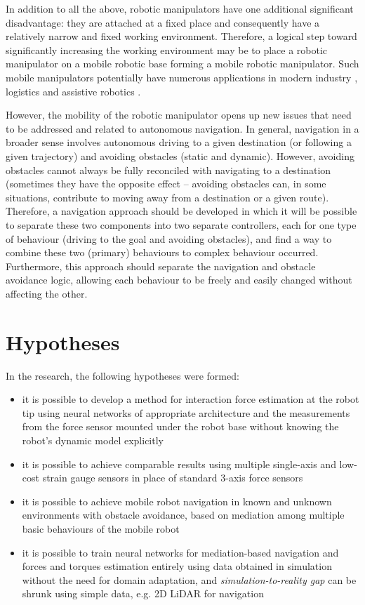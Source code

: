 In addition to all the above, robotic manipulators have one additional significant disadvantage: they are attached at a fixed place and consequently have a relatively narrow and fixed working environment. Therefore, a logical step toward significantly increasing the working environment may be to place a robotic manipulator on a mobile robotic base forming a mobile robotic manipulator. Such mobile manipulators potentially have numerous applications in modern industry \cite{Madsen2015}, logistics \cite{Iriondo2019} and assistive robotics \cite{Park2020}.

However, the mobility of the robotic manipulator opens up new issues that need to be addressed and related to autonomous navigation. In general, navigation in a broader sense involves autonomous driving to a given destination (or following a given trajectory) and avoiding obstacles (static and dynamic). However, avoiding obstacles cannot always be fully reconciled with navigating to a destination (sometimes they have the opposite effect -- avoiding obstacles can, in some situations, contribute to moving away from a destination or a given route). Therefore, a navigation approach should be developed in which it will be possible to separate these two components into two separate controllers, each for one type of behaviour (driving to the goal and avoiding obstacles), and find a way to combine these two (primary) behaviours to complex behaviour occurred. Furthermore, this approach should separate the navigation and obstacle avoidance logic, allowing each behaviour to be freely and easily changed without affecting the other.

\section{Hypotheses}

In the research, the following hypotheses were formed:

\begin{itemize}
    \item it is possible to develop a method for interaction force estimation at the robot tip using neural networks of appropriate architecture and the measurements from the force sensor mounted under the robot base without knowing the robot's dynamic model explicitly
    \item it is possible to achieve comparable results using multiple single-axis and low-cost strain gauge sensors in place of standard 3-axis force sensors
    \item it is possible to achieve mobile robot navigation in known and unknown environments with obstacle avoidance, based on mediation among multiple basic behaviours of the mobile robot
    \item it is possible to train neural networks for mediation-based navigation and forces and torques estimation entirely using data obtained in simulation without the need for domain adaptation, and \emph{simulation-to-reality gap} can be shrunk using simple data, e.g. 2D LiDAR for navigation
\end{itemize}

